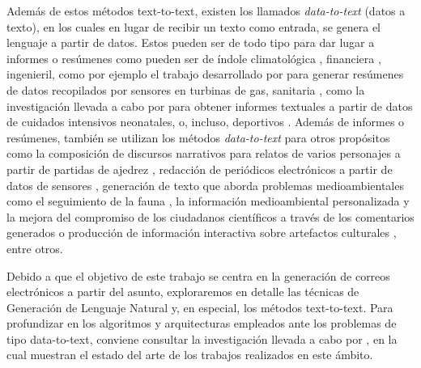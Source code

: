 Además de estos métodos text-to-text, existen los llamados \textit{data-to-text} (datos a texto), en los cuales en lugar de recibir un texto como entrada, se genera el lenguaje a partir de datos. Estos pueden ser de todo tipo para dar lugar a informes o resúmenes como pueden ser de índole climatológica \citep{goldberg1994using, ramos2014linguistic}, financiera \citep{plachouras2016interacting}, ingenieril, como por ejemplo el trabajo desarrollado por \cite{yu2007choosing} para generar resúmenes de datos recopilados por sensores en turbinas de gas, sanitaria \citep{huske2003text, banaee2013towards}, como la investigación llevada a cabo por \cite{portet2009automatic} para obtener informes textuales a partir de datos de cuidados intensivos neonatales, o, incluso, deportivos \citep{theune2001data, chen2008learning}. Además de informes o resúmenes, también se utilizan los métodos \textit{data-to-text} para otros propósitos como la composición de discursos narrativos para relatos de varios personajes a partir de partidas de ajedrez \citep{gervas2014composing}, redacción de periódicos electrónicos a partir de datos de sensores \citep{molina2011generating}, generación de texto que aborda problemas medioambientales como el seguimiento de la fauna \citep{siddharthan2012blogging, ponnamperuma2013tag2blog}, la información medioambiental personalizada \citep{wanner2015getting} y la mejora del compromiso de los ciudadanos científicos a través de los comentarios generados \citep{van2016role} o producción de información interactiva sobre artefactos culturales \citep{stock2007adaptive}, entre otros.

Debido a que el objetivo de este trabajo se centra en la generación de correos electrónicos a partir del asunto, exploraremos en detalle las técnicas de Generación de Lenguaje Natural y, en especial, los métodos text-to-text. Para profundizar en los algoritmos y arquitecturas empleados ante los problemas de tipo data-to-text, conviene consultar la investigación llevada a cabo por \cite{gatt2018survey}, en la cual muestran el estado del arte de los trabajos realizados en este ámbito.

